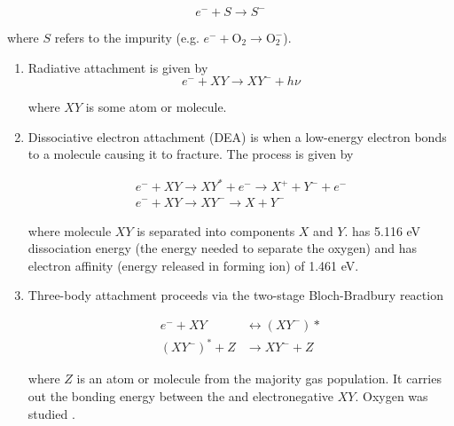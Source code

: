 \vspace{-10pt}

\begin{equation}
e^{-} + S \rightarrow S^{-}
\label{eq:impurity_attach}
\end{equation}

\noindent where $S$ refers to the impurity (e.g. $e^- + \mathrm{O_2} \rightarrow \mathrm{O_2^-}$).

\begin{enumerate}
\item Radiative attachment is given by
\vspace{-10pt}
\begin{equation}
e^- + XY \rightarrow XY^- + h \nu
\end{equation}

\vspace{-10pt}

\noindent where $XY$ is some atom or molecule.

\item Dissociative electron attachment (DEA) is when a low-energy electron bonds to a molecule causing it to fracture.  The process
is given by

\vspace{-10pt}

\begin{equation}
\begin{aligned}
e^- + XY \rightarrow XY^* + e^- \rightarrow X^+ + Y^- + e^- \\
e^- + XY \rightarrow XY^- \rightarrow X + Y^-
\end{aligned}
\end{equation}

\noindent where molecule $XY$ is separated into components $X$ and $Y$.   has 5.116 eV dissociation energy (the energy needed to
separate the oxygen) and  has electron affinity (energy released in forming ion) of 1.461 eV.

\item Three-body attachment proceeds via the two-stage Bloch-Bradbury reaction 

\vspace{-15pt}

\begin{equation}
\begin{aligned}
e^- + XY &\leftrightarrow (XY^-)* \\
(XY^-)^* + Z &\rightarrow XY^- + Z
\end{aligned}
\end{equation}

\noindent where $Z$ is an atom or molecule from the majority gas population.  It carries out the bonding energy between the
\electron and electronegative $XY$.  Oxygen was studied .
\end{enumerate}



